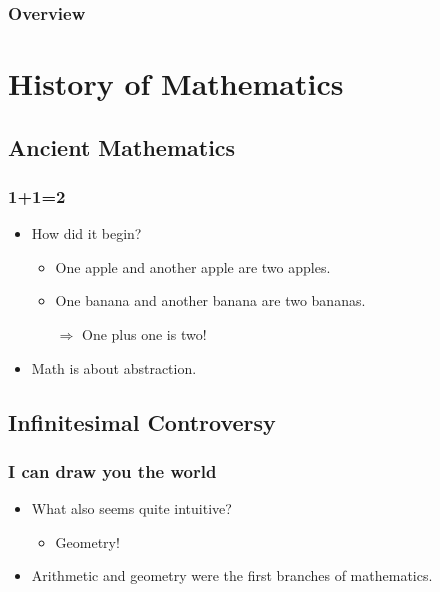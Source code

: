 \documentclass{beamer}
\begin{document}

\begin{frame}
    \frametitle{Overview} 
        \tableofcontents
\end{frame}

\section{History of Mathematics}
\subsection{Ancient Mathematics}
\begin{frame}
    \frametitle{1+1=2}
    \begin{itemize}[<+->]
	\item How did it begin?
	\begin{itemize}
		\item One apple and another apple are two apples.
		\item One banana and another banana are two bananas.
		\item[$\Rightarrow$] One plus one is two!
	\end{itemize}
	\item Math is about abstraction.
    \end{itemize}
\end{frame}
\subsection{Infinitesimal Controversy}
\begin{frame}
    \frametitle{I can draw you the world}
    \begin{itemize}[<+->]
	\item What also seems quite intuitive?
	\begin{itemize}
		\item Geometry!
	\end{itemize}
	\item Arithmetic and geometry were the first branches of mathematics.
    \end{itemize}
\end{frame}
\end{document}
